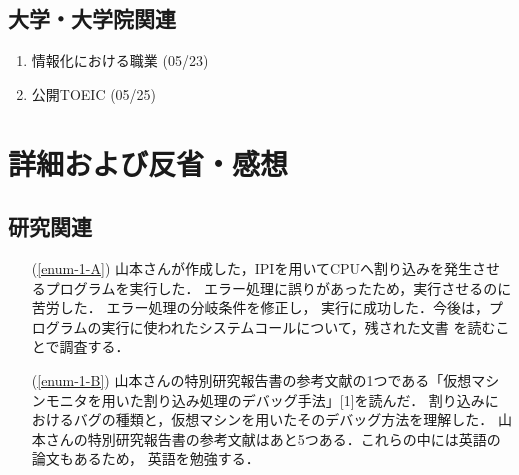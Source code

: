 \documentclass[fleqn, 14pt]{extarticle}
\begin{document}
\subsection{大学・大学院関連}
\label{sec-2-3}

\begin{enumerate}
\item 情報化における職業
\hfill
\label{enum-univ1}
(05/23)
\item 公開TOEIC
\hfill
\label{enum-univ2}
(05/25)
\end{enumerate}





\section{詳細および反省・感想}
\label{sec-3}
\subsection{研究関連}
\label{sec-3-1}

\begin{itemize}
\item[(\ref{enum-1-A})]
山本さんが作成した，IPIを用いてCPUへ割り込みを発生させるプログラムを実行した．
エラー処理に誤りがあったため，実行させるのに苦労した．
エラー処理の分岐条件を修正し，
実行に成功した．今後は，プログラムの実行に使われたシステムコールについて，残された文書
を読むことで調査する．

\item[(\ref{enum-1-B})]
山本さんの特別研究報告書の参考文献の1つである「仮想マシンモニタを用いた割り込み処理のデバッグ手法」[1]を読んだ．
割り込みにおけるバグの種類と，仮想マシンを用いたそのデバッグ方法を理解した．
山本さんの特別研究報告書の参考文献はあと5つある．これらの中には英語の論文もあるため，
英語を勉強する．
\end{itemize}


\begin{comment}
\subsection{研究室関連}
\label{sec-3-2}

\begin{itemize}
\item[(\ref{enum-laboratory3})]
平成26年度第1回研究室内部屋別対抗ボウリング大会に参加した．
乃村研の方達だけでなく，ほかの研究室の方達とも交流を深められた．
楽しい雰囲気で投げられたためか，個人で優勝することができた．
普段の力では出せない結果であるため，うれしかった．

\end{itemize}
\end{comment}
\end{document}
